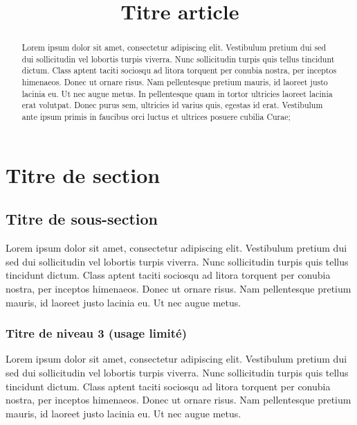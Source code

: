 \documentclass[year=2013]{jres}
\title{Titre article}
\begin{document}
\maketitle

\begin{abstract}
Lorem ipsum dolor sit amet, consectetur adipiscing elit. Vestibulum pretium dui sed dui sollicitudin vel lobortis turpis viverra. Nunc sollicitudin turpis quis tellus tincidunt dictum. Class aptent taciti sociosqu ad litora torquent per conubia nostra, per inceptos himenaeos. Donec ut ornare risus. Nam pellentesque pretium mauris, id laoreet justo lacinia eu. Ut nec augue metus. In pellentesque quam in tortor ultricies laoreet lacinia erat volutpat. Donec purus sem, ultricies id varius quis, egestas id erat. Vestibulum ante ipsum primis in faucibus orci luctus et ultrices posuere cubilia Curae; 
\end{abstract}



\section{Titre de section}

\subsection{Titre de sous-section}

Lorem ipsum dolor sit amet, consectetur adipiscing elit. Vestibulum pretium dui sed dui sollicitudin vel lobortis turpis viverra. Nunc sollicitudin turpis quis tellus tincidunt dictum. Class aptent taciti sociosqu ad litora torquent per conubia nostra, per inceptos himenaeos. Donec ut ornare risus. Nam pellentesque pretium mauris, id laoreet justo lacinia eu. Ut nec augue metus. 

\subsubsection{Titre de niveau 3 (usage limité)}

Lorem ipsum dolor sit amet, consectetur adipiscing elit. Vestibulum pretium dui sed dui sollicitudin vel lobortis turpis viverra. Nunc sollicitudin turpis quis tellus tincidunt dictum. Class aptent taciti sociosqu ad litora torquent per conubia nostra, per inceptos himenaeos.
 Donec ut ornare risus. Nam pellentesque pretium mauris, id laoreet justo lacinia eu. Ut nec augue metus. 
\end{document}

